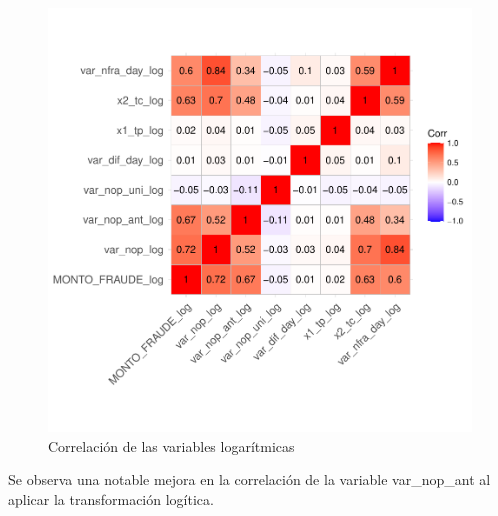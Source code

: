 \documentclass[
	11pt, %
	spanish, %
]{fphw}
\begin{document}
\begin{figure}[h!]
\begin{center}
\includegraphics[width=5.5in]{correlacion.pdf}
\caption{Correlación de las variables logarítmicas }
\label{Correlacion_log}
\end{center}
\end{figure}

Se observa una notable mejora en la correlación de la variable var\_nop\_ant al aplicar la transformación logítica.
\newpage
\end{document}
